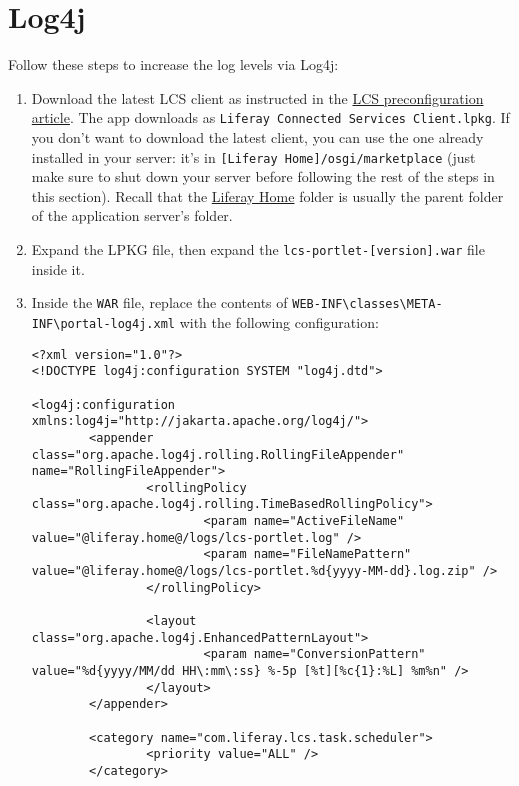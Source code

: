\section{Log4j}\label{log4j}

Follow these steps to increase the log levels via Log4j:

\begin{enumerate}
\def\labelenumi{\arabic{enumi}.}
\item
  Download the latest LCS client as instructed in the
  \href{/docs/7-2/deploy/-/knowledge_base/d/lcs-preconfiguration}{LCS
  preconfiguration article}. The app downloads as
  \texttt{Liferay\ Connected\ Services\ Client.lpkg}. If you don't want
  to download the latest client, you can use the one already installed
  in your server: it's in \texttt{{[}Liferay\ Home{]}/osgi/marketplace}
  (just make sure to shut down your server before following the rest of
  the steps in this section). Recall that the
  \href{/docs/7-2/deploy/-/knowledge_base/d/liferay-home}{Liferay Home}
  folder is usually the parent folder of the application server's
  folder.
\item
  Expand the LPKG file, then expand the
  \texttt{lcs-portlet-{[}version{]}.war} file inside it.
\item
  Inside the \texttt{WAR} file, replace the contents of
  \texttt{WEB-INF\textbackslash{}classes\textbackslash{}META-INF\textbackslash{}portal-log4j.xml}
  with the following configuration:

\begin{verbatim}
<?xml version="1.0"?>
<!DOCTYPE log4j:configuration SYSTEM "log4j.dtd">

<log4j:configuration xmlns:log4j="http://jakarta.apache.org/log4j/">
        <appender class="org.apache.log4j.rolling.RollingFileAppender" name="RollingFileAppender">
                <rollingPolicy class="org.apache.log4j.rolling.TimeBasedRollingPolicy">
                        <param name="ActiveFileName" value="@liferay.home@/logs/lcs-portlet.log" />
                        <param name="FileNamePattern" value="@liferay.home@/logs/lcs-portlet.%d{yyyy-MM-dd}.log.zip" />
                </rollingPolicy>

                <layout class="org.apache.log4j.EnhancedPatternLayout">
                        <param name="ConversionPattern" value="%d{yyyy/MM/dd HH\:mm\:ss} %-5p [%t][%c{1}:%L] %m%n" />
                </layout>
        </appender>

        <category name="com.liferay.lcs.task.scheduler">
                <priority value="ALL" />
        </category>


\end{verbatim}
\end{enumerate}
